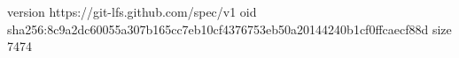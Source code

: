 version https://git-lfs.github.com/spec/v1
oid sha256:8c9a2dc60055a307b165cc7eb10cf4376753eb50a20144240b1cf0ffcaecf88d
size 7474
